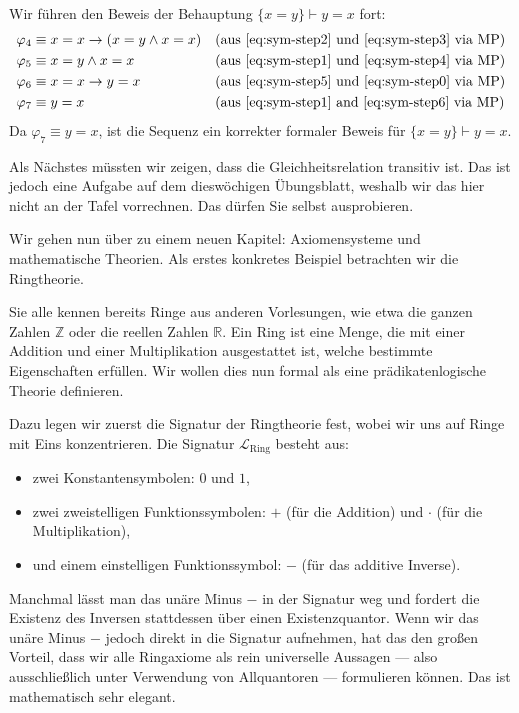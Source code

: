 \begin{math-stroke}
Wir führen den Beweis der Behauptung $\{x = y\} \vdash y = x$ fort:
\begin{align}
\varphi_4 &\equiv x = x \rightarrow (x = y \wedge x = x) && \text{(aus \ref{eq:sym-step2} und \ref{eq:sym-step3} via $\text{MP}$)} \label{eq:sym-step4} \\
\varphi_5 &\equiv x = y \wedge x = x && \text{(aus \ref{eq:sym-step1} und \ref{eq:sym-step4} via $\text{MP}$)} \label{eq:sym-step5} \\
\varphi_6 &\equiv x = x \rightarrow y = x && \text{(aus \ref{eq:sym-step5} und \ref{eq:sym-step0} via $\text{MP}$)} \label{eq:sym-step6} \\
\varphi_7 &\equiv y = x && \text{(aus \ref{eq:sym-step1} and \ref{eq:sym-step6} via $\text{MP}$)} \label{eq:sym-step7}
\end{align}
Da $\varphi_7 \equiv y = x$, ist die Sequenz ein korrekter formaler Beweis für $\{x = y\} \vdash y = x$.
\end{math-stroke}

\begin{spoken-clean}[01:02:27 - 01:03:42]
Als Nächstes müssten wir zeigen, dass die Gleichheitsrelation transitiv ist. Das ist jedoch eine Aufgabe auf dem dieswöchigen Übungsblatt, weshalb wir das hier nicht an der Tafel vorrechnen. Das dürfen Sie selbst ausprobieren. 

Wir gehen nun über zu einem neuen Kapitel: Axiomensysteme und mathematische Theorien. Als erstes konkretes Beispiel betrachten wir die Ringtheorie. 

Sie alle kennen bereits Ringe aus anderen Vorlesungen, wie etwa die ganzen Zahlen $\mathbb{Z}$ oder die reellen Zahlen $\mathbb{R}$. Ein Ring ist eine Menge, die mit einer Addition und einer Multiplikation ausgestattet ist, welche bestimmte Eigenschaften erfüllen. Wir wollen dies nun formal als eine prädikatenlogische Theorie definieren. 

Dazu legen wir zuerst die Signatur der Ringtheorie fest, wobei wir uns auf Ringe mit Eins konzentrieren. Die Signatur $\mathcal{L}_{\text{Ring}}$ besteht aus:
\begin{itemize}
    \item zwei Konstantensymbolen: $0$ und $1$,
    \item zwei zweistelligen Funktionssymbolen: $+$ (für die Addition) und $\cdot$ (für die Multiplikation),
    \item und einem einstelligen Funktionssymbol: $-$ (für das additive Inverse).
\end{itemize}

Manchmal lässt man das unäre Minus $-$ in der Signatur weg und fordert die Existenz des Inversen stattdessen über einen Existenzquantor. Wenn wir das unäre Minus $-$ jedoch direkt in die Signatur aufnehmen, hat das den großen Vorteil, dass wir alle Ringaxiome als rein universelle Aussagen --- also ausschließlich unter Verwendung von Allquantoren --- formulieren können. Das ist mathematisch sehr elegant.
\end{spoken-clean}

